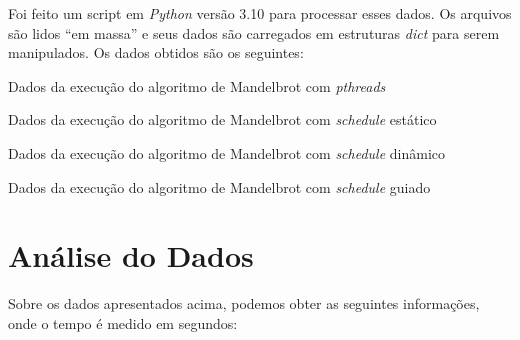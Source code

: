 \documentclass[10pt,a4paper]{article}
\begin{document}
		Foi feito um script em \textit{Python} versão 3.10 para processar esses dados. Os arquivos são lidos ``em massa'' e seus dados são carregados em
		estruturas \textit{dict} para serem manipulados. Os dados obtidos são os seguintes:

		\begin{table}[htb]
			\begin{adjustwidth}{-1cm}{}
				\caption{Dados da execução do algoritmo de Mandelbrot com \textit{pthreads}}
			\end{adjustwidth}
		\end{table}
		\begin{table}[htb]
			\begin{adjustwidth}{-1cm}{}
				\caption{Dados da execução do algoritmo de Mandelbrot com \textit{schedule} estático}
			\end{adjustwidth}
		\end{table}
		\begin{table}[htb]
			\begin{adjustwidth}{-1cm}{}
				\caption{Dados da execução do algoritmo de Mandelbrot com \textit{schedule} dinâmico}
			\end{adjustwidth}
		\end{table}
		\begin{table}[htb]
			\begin{adjustwidth}{-1cm}{}
				\caption{Dados da execução do algoritmo de Mandelbrot com \textit{schedule} guiado}
			\end{adjustwidth}
		\end{table}

	\clearpage
	\section{Análise do Dados}

		Sobre os dados apresentados acima, podemos obter as seguintes informações, onde o tempo é medido em segundos:
\end{document}
